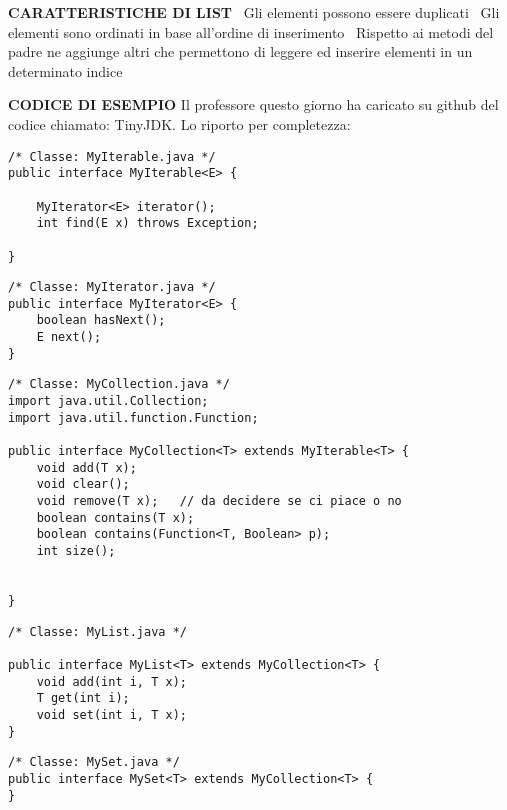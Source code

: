 \noindent \textbf{CARATTERISTICHE DI LIST}\newline
\textbullet\ Gli elementi possono essere duplicati \newline
\textbullet\ Gli elementi sono ordinati in base all'ordine di inserimento \newline	
\textbullet\ Rispetto ai metodi del padre ne aggiunge altri che permettono di leggere ed inserire elementi in un determinato indice \newline

\noindent \textbf{CODICE DI ESEMPIO}\newline
Il professore questo giorno ha caricato su github del codice chiamato: TinyJDK. Lo riporto per completezza:
\begin{lstlisting}[basicstyle=\small,]
/* Classe: MyIterable.java */
public interface MyIterable<E> {

    MyIterator<E> iterator();
    int find(E x) throws Exception;

}
\end{lstlisting}

\begin{lstlisting}[basicstyle=\small,]
/* Classe: MyIterator.java */
public interface MyIterator<E> {
    boolean hasNext();
    E next();
}
\end{lstlisting}

\begin{lstlisting}[basicstyle=\small,]
/* Classe: MyCollection.java */
import java.util.Collection;
import java.util.function.Function;

public interface MyCollection<T> extends MyIterable<T> {
    void add(T x);
    void clear();
    void remove(T x);   // da decidere se ci piace o no
    boolean contains(T x);
    boolean contains(Function<T, Boolean> p);
    int size();


}
\end{lstlisting}

\begin{lstlisting}[basicstyle=\small,]
/* Classe: MyList.java */

public interface MyList<T> extends MyCollection<T> {
    void add(int i, T x);
    T get(int i);
    void set(int i, T x);
}
\end{lstlisting}

\begin{lstlisting}[basicstyle=\small,]
/* Classe: MySet.java */
public interface MySet<T> extends MyCollection<T> {
}
\end{lstlisting}

